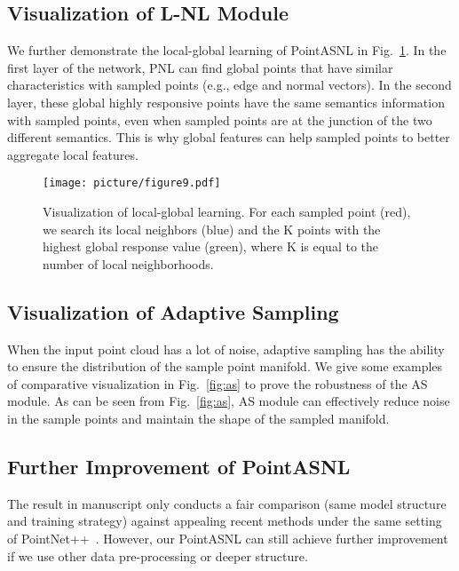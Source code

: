 \documentclass[10pt,twocolumn,letterpaper]{article}
\begin{document}
	
	\subsection{Visualization of L-NL Module}
	
	We further demonstrate the local-global learning of PointASNL in Fig.~\ref{fig:figure9}. In the first layer of the network, PNL can find global points that have similar characteristics with sampled points (e.g., edge and normal vectors). In the second layer, these global highly responsive points have the same semantics information with sampled points, even when sampled points are at the junction of the two different semantics. This is why global features can help sampled points to better aggregate local features.
	
	\begin{figure}[!tbp]
		\begin{center}
			\texttt{[image: picture/figure9.pdf]}
		\end{center}
		\caption{ {Visualization of local-global learning}. For each sampled point (red), we search its local neighbors (blue) and the K points with the highest global response value (green), where K is equal to the number of local neighborhoods. }
		\vspace{-0.5cm}
		\label{fig:figure9}
	\end{figure}
	
	\subsection{Visualization of Adaptive Sampling}
	When the input point cloud has a lot of noise, adaptive sampling has the ability to ensure the distribution of the sample point manifold. We give some examples of comparative visualization in Fig.~\ref{fig:as} to prove the robustness of the AS module. As can be seen from Fig.~\ref{fig:as}, AS module can effectively reduce noise in the sample points and maintain the shape of the sampled manifold.
	
	\subsection{Further Improvement of PointASNL}
	The result in manuscript only conducts a {fair comparison} (same model structure and training strategy) against appealing recent methods under the same setting of PointNet++~\cite{pointnet2}. However, our PointASNL can still achieve further improvement if we use other data pre-processing or deeper structure. 
	
\end{document}

